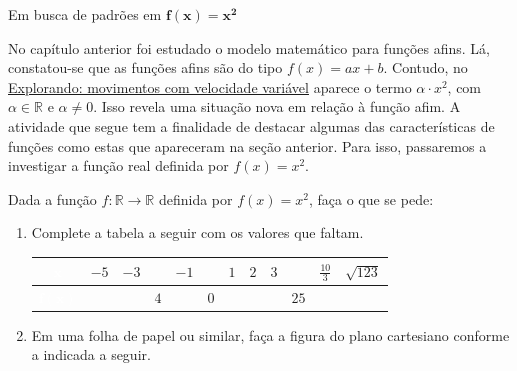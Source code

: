 \label{\detokenize{AF209-2:sec-funcao-quadratica-propriedades-de-x-a-2}}\label{\detokenize{AF209-2::doc}}\label{\detokenize{AF209-2:explorando-a-funcao-real-definida-por}}\label{\detokenize{AF209-2:ativ-funcao-quadratica-investigando-x-a-2}}
\begin{task}{Em busca de padrões em \(\bm{f(x)=x^2}\)}

No capítulo anterior foi estudado o modelo matemático para funções afins. Lá, constatou-se que as funções afins são do tipo \(f(x)=ax+b\). Contudo, no \hyperref[\detokenize{AF209-0:sec-funcao-quadratica-movimento-com-velocidade-variavel-queda-vertical}]{Explorando: movimentos com velocidade variável} aparece o termo \(\alpha \cdot x^2\), com \(\alpha \in \mathbb{R}\) e \(\alpha \neq 0\). Isso revela uma situação nova em relação à função afim. A atividade que segue tem a finalidade de destacar algumas das características de funções como estas que apareceram na seção anterior. Para isso, passaremos a investigar a função real definida por \(f(x)=x^2\).

Dada a função \(f: \mathbb{R} \to \mathbb{R}\) definida por \(f(x)=x^2\), faça o que se pede:
\begin{enumerate}
\item {} 
Complete a tabela a seguir com os valores que faltam.

\begin{table}[H]
\setlength
\tabulinesep{1mm}
\centering
\begin{tabu} to \textwidth{|c|c|c|c|c|c|c|c|c|c|c|c|}
\hline
{}\textcolor{white}{\(\bm{x}\)} & \(-5\) & \(-3\) & & \(-1\) & & \(1\) & \(2\) & \(3\) & & \(\frac{10}{3}\) & \(\sqrt{123}\) \\
\hline
{}\textcolor{white}{$\bm{f(x)}$} & & & \(4\) & & \(0\) & & & & \(25\) & & \\
\hline
\end{tabu}
\end{table}


\item {} 
Em uma folha de papel ou similar, faça a figura do plano cartesiano conforme a indicada a seguir.
\begin{figure}[H]
\centering


\end{figure}
\end{enumerate}
\end{task}
